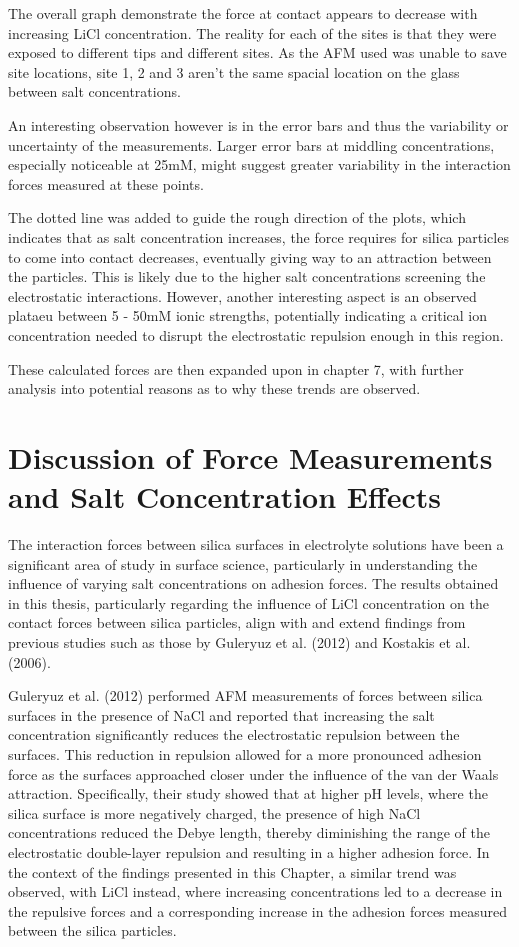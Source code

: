 The overall graph demonstrate the force at contact appears to decrease with increasing LiCl concentration. The reality for each of the sites is that they were exposed to different tips and different sites. As the AFM used was unable to save site locations, site 1, 2 and 3 aren't the same spacial location on the glass between salt concentrations.

An interesting observation however is in the error bars and thus the variability or uncertainty of the measurements. Larger error bars at middling concentrations, especially noticeable at 25mM, might suggest greater variability in the interaction forces measured at these points.

The dotted line was added to guide the rough direction of the plots, which indicates that as salt concentration increases, the force requires for silica particles to come into contact decreases, eventually giving way to an attraction between the particles. This is likely due to the higher salt concentrations screening the electrostatic interactions. However, another interesting aspect is an observed plataeu between 5 - 50mM ionic strengths, potentially indicating a critical ion concentration needed to disrupt the electrostatic repulsion enough in this region.

These calculated forces are then expanded upon in chapter 7, with further analysis into potential reasons as to why these trends are observed.

\section{Discussion of Force Measurements and Salt Concentration Effects}

The interaction forces between silica surfaces in electrolyte solutions have been a significant area of study in surface science, particularly in understanding the influence of varying salt concentrations on adhesion forces. The results obtained in this thesis, particularly regarding the influence of LiCl concentration on the contact forces between silica particles, align with and extend findings from previous studies such as those by Guleryuz et al. (2012) and Kostakis et al. (2006). \cite{Kostakis2006} \cite{Guleryuz2012}

Guleryuz et al. (2012) performed AFM measurements of forces between silica surfaces in the presence of NaCl and reported that increasing the salt concentration significantly reduces the electrostatic repulsion between the surfaces. This reduction in repulsion allowed for a more pronounced adhesion force as the surfaces approached closer under the influence of the van der Waals attraction. Specifically, their study showed that at higher pH levels, where the silica surface is more negatively charged, the presence of high NaCl concentrations reduced the Debye length, thereby diminishing the range of the electrostatic double-layer repulsion and resulting in a higher adhesion force. In the context of the findings presented in this Chapter, a similar trend was observed, with LiCl instead, where increasing concentrations led to a decrease in the repulsive forces and a corresponding increase in the adhesion forces measured between the silica particles. \cite{Guleryuz2012}

